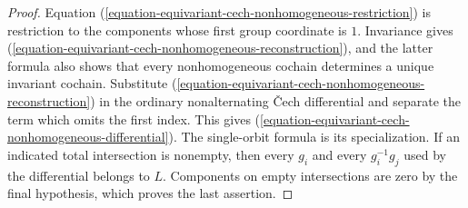 \begin{proof}
Equation
(\ref{equation-equivariant-cech-nonhomogeneous-restriction}) is restriction
to the components whose first group coordinate is $1$. Invariance gives
(\ref{equation-equivariant-cech-nonhomogeneous-reconstruction}), and the
latter formula also shows that every nonhomogeneous cochain determines a
unique invariant cochain. Substitute
(\ref{equation-equivariant-cech-nonhomogeneous-reconstruction}) in the
ordinary nonalternating \v Cech differential and separate the term which
omits the first index. This gives
(\ref{equation-equivariant-cech-nonhomogeneous-differential}). The
single-orbit formula is its specialization. If an indicated total
intersection is nonempty, then every $g_i$ and every $g_i^{-1}g_j$ used by
the differential belongs to $L$. Components on empty intersections are
zero by the final hypothesis, which proves the last assertion.
\end{proof}


